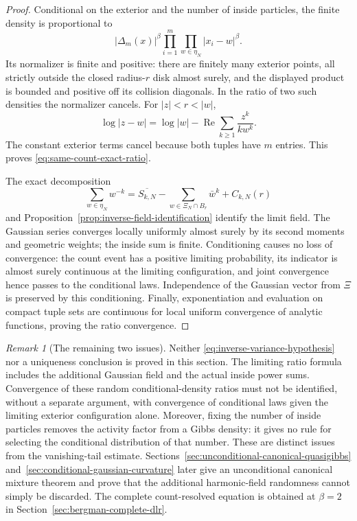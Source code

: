 \documentclass[11pt,a4paper]{article}
\numberwithin{equation}{section}
\theoremstyle{definition}
\theoremstyle{remark}
\newtheorem{remark}[theorem]{Remark}
\begin{document}
\begin{proof}
Conditional on the exterior and the number of inside particles, the
finite density is proportional to
\[
 |\Delta_m(x)|^\beta
            \prod_{i=1}^m\prod_{w\in\eta_N}|x_i-w|^\beta.
\]
Its normalizer is finite and positive: there are finitely many exterior
points, all strictly outside the closed radius-$r$ disk almost surely,
and the displayed product is bounded and positive off its collision
diagonals. In the ratio of two such densities the normalizer cancels.
For $|z|<r<|w|$,
\[
 \log|z-w|=\log|w|-\operatorname{Re}
                      \sum_{k\geq1}\frac{z^k}{kw^k}.
\]
The constant exterior terms cancel because both tuples have $m$ entries.
This proves \eqref{eq:same-count-exact-ratio}.

The exact decomposition
\[
 \sum_{w\in\eta_N}w^{-k}
 =\overline{S_{k,N}}-
       \sum_{w\in\Xi_N\cap B_r}\bar w^k+C_{k,N}(r)
\]
and Proposition~\ref{prop:inverse-field-identification} identify the
limit field. The Gaussian series converges locally uniformly almost
surely by its second moments and geometric weights; the inside sum is
finite. Conditioning causes no loss of convergence: the count event
has a positive limiting probability, its indicator is almost surely
continuous at the limiting configuration, and joint convergence hence
passes to the conditional laws. Independence of the Gaussian vector
from $\Xi$ is preserved by this conditioning. Finally, exponentiation
and evaluation on compact tuple sets are continuous for local uniform
convergence of analytic functions, proving the ratio convergence.
\end{proof}

\begin{remark}[The remaining two issues]
Neither \eqref{eq:inverse-variance-hypothesis} nor a uniqueness conclusion
is proved in this section. The limiting ratio formula includes the
additional Gaussian field and the actual inside power sums. Convergence
of these random conditional-density ratios must not be identified,
without a separate argument, with convergence of conditional laws given
the limiting exterior configuration alone. Moreover, fixing the number
of inside particles removes the activity factor from a Gibbs density:
it gives no rule for selecting the conditional distribution of that
number. These are distinct issues from the vanishing-tail estimate.
Sections~\ref{sec:unconditional-canonical-quasigibbs}
and~\ref{sec:conditional-gaussian-curvature} later give an unconditional
canonical mixture theorem and prove that the additional harmonic-field
randomness cannot simply be discarded. The complete count-resolved
equation is obtained at $\beta=2$ in
Section~\ref{sec:bergman-complete-dlr}.
\end{remark}
\end{document}
